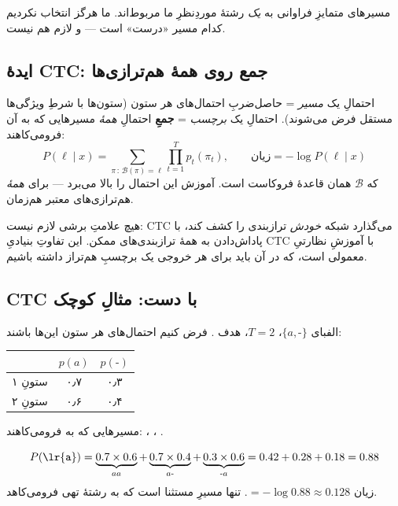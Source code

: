 \documentclass[12pt,a4paper]{article}
\begin{document}
مسیرهای متمایزِ فراوانی به \emph{یک} رشتهٔ موردِنظرِ ما مربوط‌اند. ما هرگز انتخاب نکردیم کدام مسیر «درست» است — و لازم هم نیست.

\subsection{ایدهٔ CTC: جمع روی همهٔ هم‌ترازی‌ها}

\begin{riyazi}
احتمالِ یک \emph{مسیر} = حاصل‌ضربِ احتمال‌های هر ستون (ستون‌ها با شرطِ ویژگی‌ها مستقل فرض می‌شوند). احتمالِ یک \emph{برچسب} = \textbf{جمعِ} احتمالِ \emph{همهٔ} مسیرهایی که به آن فرومی‌کاهند:
\[
P(\ell \mid x) = \sum_{\pi\,:\,\mathcal{B}(\pi)=\ell} \prod_{t=1}^{T} p_t(\pi_t),
\qquad \text{زیان} = -\log P(\ell \mid x)
\]
که $\mathcal{B}$ همان قاعدهٔ فروکاست است. آموزش این احتمال را بالا می‌برد — برای \emph{همهٔ} هم‌ترازی‌های معتبر هم‌زمان.
\end{riyazi}

\begin{nokte}
هیچ علامتِ برشی لازم نیست: CTC می‌گذارد شبکه \emph{خودش} ترازبندی را کشف کند، با پاداش‌دادن به همهٔ ترازبندی‌های ممکن. این تفاوتِ بنیادیِ CTC با آموزشِ نظارتیِ معمولی است، که در آن باید برای هر خروجی یک برچسبِ هم‌تراز داشته باشیم.
\end{nokte}

\subsection{CTC با دست: مثالِ کوچک}

الفبای $\{a,\text{-}\}$، $T=2$، هدف . فرض کنیم احتمال‌های هر ستون این‌ها باشند:

\begin{center}
\begin{tabular}{@{}lcc@{}}
\hline
 & $p(a)$ & $p(\text{-})$ \\
\hline
ستونِ ۱ & ۰٫۷ & ۰٫۳ \\
ستونِ ۲ & ۰٫۶ & ۰٫۴ \\
\hline
\end{tabular}
\end{center}

مسیرهایی که به  فرومی‌کاهند: ، ، .

\begin{riyazi}
\[
P(\text{\lr{\texttt{a}}}) = \underbrace{0.7\times0.6}_{aa} + \underbrace{0.7\times0.4}_{a\text{-}} + \underbrace{0.3\times0.6}_{\text{-}a}
= 0.42 + 0.28 + 0.18 = 0.88
\]
زیان $= -\log 0.88 \approx 0.128$. تنها مسیرِ مستثنا \lr{\texttt{- -}} است که به رشتهٔ تهی فرومی‌کاهد.
\end{riyazi}
\end{document}
